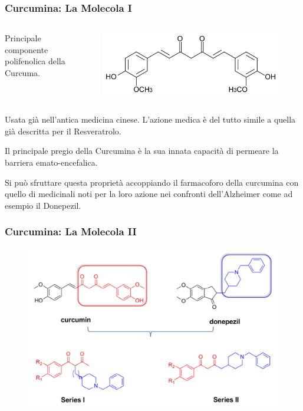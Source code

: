 \documentclass[9pt]{beamer}
\begin{document}
\begin{frame}
	\frametitle{Curcumina: La Molecola I}
	\begin{columns}
		\begin{column}{.4\textwidth}
			Principale componente polifenolica della Curcuma.
		\end{column}
		\begin{column}{.6\textwidth}
			\begin{figure}
				\includegraphics[width=.8\textwidth]{immagini/curcumina.png}
			\end{figure}
		\end{column}
	\end{columns}
	\bigskip
	
	Usata già nell'antica medicina cinese. L'azione medica è del tutto simile a quella già descritta per il Resveratrolo.
	
	Il principale pregio della Curcumina è la sua innata capacità di permeare la barriera emato-encefalica.
	
	Si può sfruttare questa proprietà accoppiando il farmacoforo della curcumina con quello di medicinali noti per la loro azione nei confronti dell'Alzheimer come ad esempio il Donepezil.
\end{frame}

\begin{frame}
	\frametitle{Curcumina: La Molecola II}
	\begin{figure}
		\includegraphics[scale=0.9]{immagini/generale_curcdone.png}
	\end{figure}
\end{frame}
\end{document}
